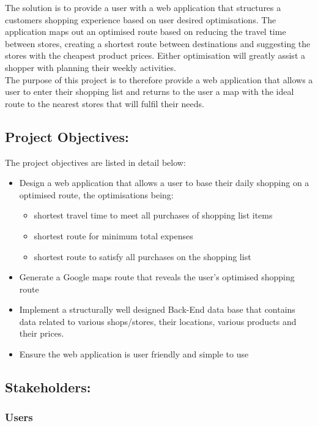 \documentclass[10pt, a4paper, twocolumn]{scrartcl}
\begin{document}
		The solution is to provide a user with a web application that structures a customers shopping experience based on user desired optimisations. The application maps out an optimised route based on reducing the travel time between stores, creating a shortest route between destinations and suggesting the stores with the cheapest product prices. Either optimisation will greatly assist a shopper with planning their weekly activities. \\
		
		The purpose of this project is to therefore provide a web application that allows a user to enter their shopping list and returns to the user a map with the ideal route to the nearest stores that will fulfil their needs. 
	
	\subsection{Project Objectives:}
	
		The project objectives are listed in detail below:
		
			\begin{itemize}[noitemsep]
				\item Design a web application that allows a user to base their daily shopping on a optimised route, the optimisations being:
					\begin{itemize}
						\item shortest travel time to meet all purchases of shopping list items 
						\item shortest route for minimum total expenses
						\item shortest route to satisfy all purchases on the shopping list 
					\end{itemize}
				\item Generate a Google maps route that reveals the user's optimised shopping route
				\item Implement a structurally well designed Back-End data base that contains data related to various shops/stores, their locations, various products and their prices.
				\item Ensure the web application is user friendly and simple to use
			\end{itemize}
	
	\subsection{Stakeholders:}
	
		\subsubsection{Users}
		
\end{document}
